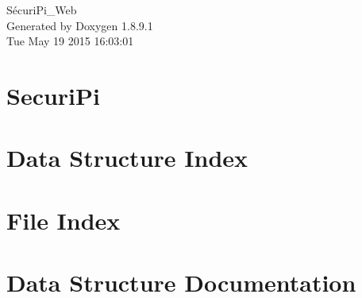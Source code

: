 \documentclass[twoside]{book}
\newcommand{\+}{\discretionary{\mbox{\scriptsize$\hookleftarrow$}}{}{}}
\newcommand{\clearemptydoublepage}{%
  \newpage{\pagestyle{empty}\cleardoublepage}%
}
\begin{document}
\begin{titlepage}
\vspace*{7cm}
\begin{center}%
{\Large Sécuri\+Pi\+\_\+\+Web }\\
\vspace*{1cm}
{\large Generated by Doxygen 1.8.9.1}\\
\vspace*{0.5cm}
{\small Tue May 19 2015 16:03:01}\\
\end{center}
\end{titlepage}
\clearemptydoublepage
\tableofcontents
\clearemptydoublepage
{}

\chapter{Securi\+Pi}
\label{md__c_1__users_tekmor__documents__d_xC3_xA9veloppement__securi_pi__web-master__r_e_a_d_m_e}

\chapter{Data Structure Index}

\chapter{File Index}

\chapter{Data Structure Documentation}

\end{document}
